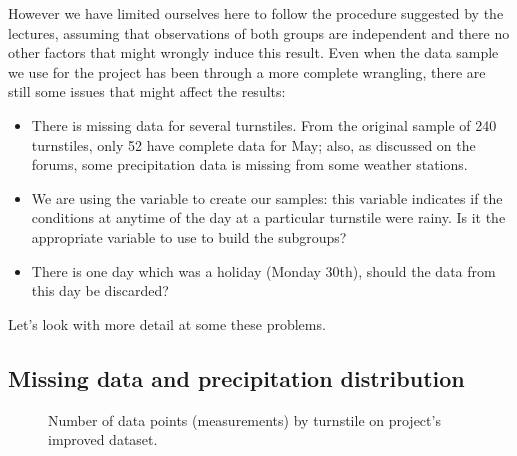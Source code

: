 \documentclass[a4paper,12pt,english]{sphinxmanual}
\begin{document}
However we have limited ourselves here to follow the procedure suggested by the
lectures, assuming that observations of both groups are independent and there
no other factors that might wrongly induce this result. Even when the data sample
we use for the project has been through a more complete wrangling, there are
still some issues that might affect the results:
\begin{itemize}
\item {} 
There is missing data for several turnstiles. From the original sample of 240
turnstiles, only 52 have complete data for May; also, as discussed on the
forums, some precipitation data is missing from some weather stations.

\item {} 
We are using the variable  to create our samples: this variable
indicates if the conditions at anytime of the day at a particular turnstile
were rainy. Is it the appropriate variable to use to build the subgroups?

\item {} 
There is one day which was a holiday (Monday 30th), should the data from this
day be discarded?

\end{itemize}

Let's look with more detail at some these problems.


\subsection{Missing data and precipitation distribution}
\label{section1:missing-data-and-precipitation-distribution}\begin{figure}[htbp]
\centering
\capstart

\caption{Number of data points (measurements) by turnstile on project's improved
dataset.}\label{section1:figure22}\end{figure}
\end{document}
